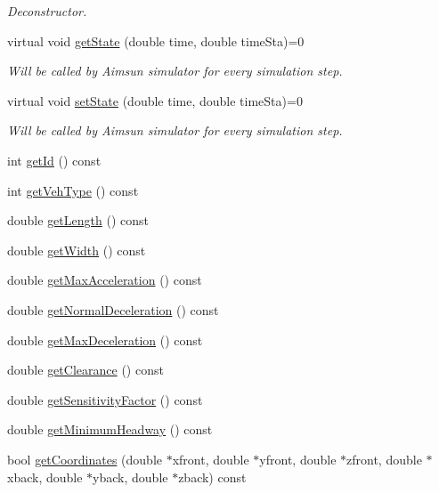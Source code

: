 \begin{DoxyCompactItemize}
\begin{DoxyCompactList}\small\item\em Deconstructor. \end{DoxyCompactList}\item 
virtual void \hyperlink{classADynamicAgent_a44aacef8be0302f2edc528a6b96168f7}{get\+State} (double time, double time\+Sta)=0
\begin{DoxyCompactList}\small\item\em Will be called by Aimsun simulator for every simulation step. \end{DoxyCompactList}\item 
virtual void \hyperlink{classADynamicAgent_ae52606684f790a26d46861ea21e932e7}{set\+State} (double time, double time\+Sta)=0
\begin{DoxyCompactList}\small\item\em Will be called by Aimsun simulator for every simulation step. \end{DoxyCompactList}\item 
int \hyperlink{classADynamicAgent_afaf6756338d00b2448776747ad00ea65}{get\+Id} () const 
\item 
int \hyperlink{classADynamicAgent_a9ca35fea075e20e491e493d9fd44df92}{get\+Veh\+Type} () const 
\item 
double \hyperlink{classADynamicAgent_acf478908f7f973585b5be726581421ac}{get\+Length} () const 
\item 
double \hyperlink{classADynamicAgent_a1193101357f3a12c4ba71965960c07ca}{get\+Width} () const 
\item 
double \hyperlink{classADynamicAgent_a59ef63d722e335a71a7b6a0df0d71ee4}{get\+Max\+Acceleration} () const 
\item 
double \hyperlink{classADynamicAgent_aace95766f8809611d1031b979fa8a337}{get\+Normal\+Deceleration} () const 
\item 
double \hyperlink{classADynamicAgent_a853f42ee7434c44c3c69c4151aeec7ff}{get\+Max\+Deceleration} () const 
\item 
double \hyperlink{classADynamicAgent_ab6af88406508481aee9ea2ed6acea157}{get\+Clearance} () const 
\item 
double \hyperlink{classADynamicAgent_a4d9313c66b0b8f000d294f7055211488}{get\+Sensitivity\+Factor} () const 
\item 
double \hyperlink{classADynamicAgent_adae57adcd692c56f1660dd95c2c827fa}{get\+Minimum\+Headway} () const 
\item 
bool \hyperlink{classADynamicAgent_af9a306fbf63c42dafdb3e5c9fc16cd40}{get\+Coordinates} (double $\ast$xfront, double $\ast$yfront, double $\ast$zfront, double $\ast$xback, double $\ast$yback, double $\ast$zback) const 

\end{DoxyCompactItemize}
